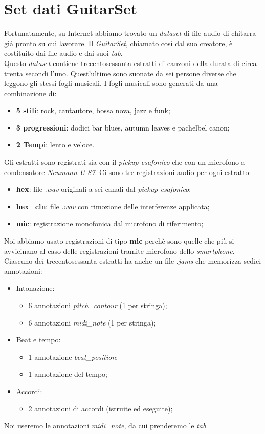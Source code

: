 \section{Set dati GuitarSet}
Fortunatamente, su Internet abbiamo trovato un \textit{dataset} di file audio di chitarra già pronto su cui lavorare. Il \textit{GuitarSet}, chiamato così dal suo creatore, è costituito dai file audio e dai suoi \textit{tab}.\\
\newline
Questo \textit{dataset} contiene trecentosessanta estratti di canzoni della durata di circa trenta secondi l'uno. Quest'ultime sono suonate da sei persone diverse che leggono gli stessi fogli musicali. I fogli musicali sono generati da una combinazione di:
\begin{itemize}
	\item \textbf{5 stili}: rock, cantautore, bossa nova, jazz e funk;
	\item \textbf{3 progressioni}: dodici bar blues, autumn leaves e pachelbel canon;
	\item \textbf{2 Tempi}: lento e veloce.
\end{itemize}
Gli estratti sono registrati sia con il \textit{pickup esafonico} che con un microfono a condensatore \textit{Neumann U-87}.
Ci sono tre registrazioni audio per ogni estratto:
\begin{itemize}
	\item \textbf{hex}: file .\textit{wav} originali a sei canali dal \textit{pickup esafonico};
	\item \textbf{hex\_cln}: file .\textit{wav} con rimozione delle interferenze applicata;
	\item \textbf{mic}: registrazione monofonica dal microfono di riferimento;
\end{itemize}
Noi abbiamo usato registrazioni di tipo \textbf{mic} perchè sono quelle che più si avvicinano al caso delle registrazioni tramite microfono dello \textit{smartphone}.\\
\newline
Ciascuno dei trecentosessanta estratti ha anche un file .\textit{jams} che memorizza sedici annotazioni:
\begin{itemize}
	\item Intonazione:
	\begin{itemize}
		\item 6 annotazioni \textit{pitch\_contour} (1 per stringa);
		\item 6 annotazioni \textit{midi\_note} (1 per stringa);
	\end{itemize}
	\item Beat e tempo:
	\begin{itemize}
		\item 1 annotazione \textit{beat\_position};
		\item 1 annotazione del tempo;
	\end{itemize}
	\item Accordi:
	\begin{itemize}
		\item 2 annotazioni di accordi (istruite ed eseguite);
	\end{itemize}
\end{itemize}
Noi useremo le annotazioni \textit{midi\_note}, da cui prenderemo le \textit{tab}.
